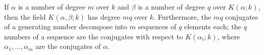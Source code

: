 If $\alpha$ is a number of degree $m$ over $k$ and $\beta$ is a number of degree $q$ over $K(\alpha; k)$, then the field $K(\alpha, \beta; k)$ has degree $mq$ over $k$. Furthermore, the $mq$ conjugates of a generating number decompose into $m$ sequences of $q$ elements each; the $q$ numbers of a sequence are the conjugates with respect to $K(\alpha_i; k)$, where $\alpha_1, \ldots, \alpha_m$ are the conjugates of $\alpha$.

